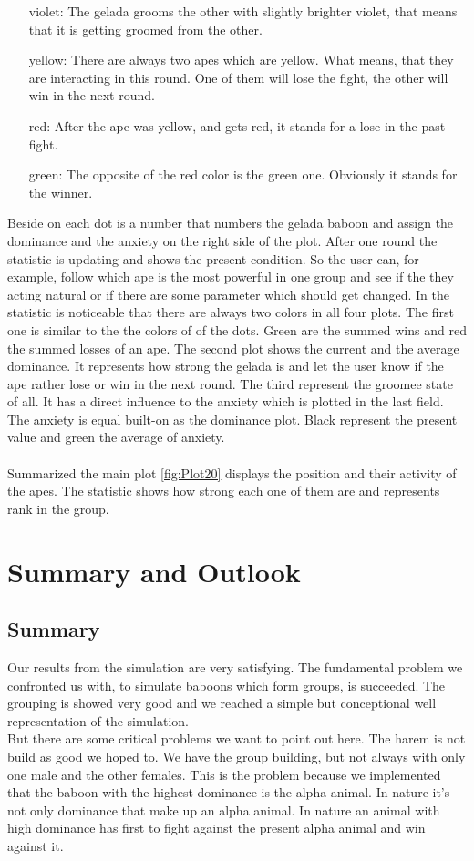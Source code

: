 \documentclass[11pt]{article}
\begin{document}
\begin{itemize} 
\item[violet:] The gelada grooms the other with slightly brighter violet, that means that it is getting groomed from the other.
\item[yellow:] There are always two apes which are yellow. What means, that they are interacting in this round. One of them will lose the fight, the other will win in the next round.
\item[red:] After the ape was yellow, and gets red, it stands for a lose in the past fight.
\item[green:] The opposite of the red color is the green one. Obviously it stands for the winner.
\end{itemize}
Beside on each dot is a number that numbers the gelada baboon and assign the dominance and the anxiety on the right side of the plot. After one round the statistic is updating and shows the present condition. So the user can, for example, follow which ape is the most powerful in one group and see if the they acting natural or if there are some parameter which should get changed. In the statistic is noticeable that there are always two colors in all four plots. The first one is similar to the the colors of of the dots. Green are the summed wins and red the summed losses of an ape. The second plot shows the current and the average dominance. It represents how strong the gelada is and let the user know if the ape rather lose or win in the next round. 
The third represent the groomee state of all. It has a direct influence to the anxiety which is plotted in the last field. The anxiety is equal built-on as the dominance plot. Black represent the present value and green the average of anxiety.\\
\\
Summarized the main plot \ref{fig:Plot20} displays the position and their activity of the apes. The statistic shows how strong each one of them are and represents rank in the group.

\section{Summary and Outlook}
\subsection{Summary}
\label{sec:Summary}
Our results from the simulation are very satisfying. The fundamental problem we confronted us with, to simulate baboons which form groups, is succeeded. The grouping is showed very good and we reached a simple but conceptional well representation of the simulation.\\
But there are some critical problems we want to point out here. The harem is not build as good we hoped to. We have the group building, but not always with only one male and the other females. This is the problem because we implemented that the baboon with the highest dominance is the alpha animal. In nature it's not only dominance that make up an alpha animal. In nature an animal with high dominance has first to fight against the present alpha animal and win against it.
\end{document}
